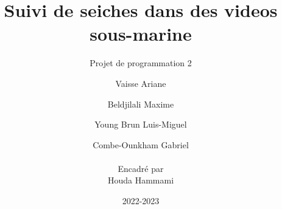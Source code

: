 \documentclass[12pt, a4paper]{scrbook}
\title{ Suivi de seiches dans des videos sous-marine}
\subtitle{Projet de programmation 2 }         %
\author{ Vaisse Ariane \and Beldjilali Maxime \and Young Brun Luis-Miguel \and Combe-Ounkham Gabriel \\ \\
		\small{Encadré par} \\ \small{Houda Hammami}}
\date{2022-2023}
\begin{document}
\maketitle



\tableofcontents \clearpage

\listoffigures \clearpage

\listofalgorithms \clearpage
















\cite{xu_human_2010}
\cite{kong_particle_2019}
\cite{qiang_zhu_fast_2006}
\cite{dalal_histograms_2005}
\cite{bhattacharyya_measure_1960}
\cite{rlabbe}


\printbibliography


\end{document}
